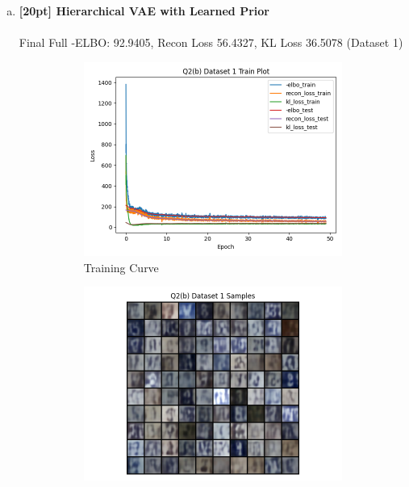 \documentclass{article}
\begin{document}
\begin{enumerate}[(a)]
        \newpage

        \item {\bf [20pt] Hierarchical VAE with Learned Prior} \\\\
        Final Full -ELBO: 92.9405, Recon Loss 56.4327, KL Loss 36.5078 (Dataset 1)
        \begin{figure}[H]
               \centering
               \begin{subfigure}[b]{0.475\textwidth}
                   \centering
                   \includegraphics[width=\textwidth]{figures/q2_b_dset1_train_plot.png}
                   \caption{Training Curve}
               \end{subfigure}
               \hfill
               \begin{subfigure}[b]{0.475\textwidth}
                   \centering
                   \includegraphics[width=\textwidth]{figures/q2_b_dset1_samples.png}

\end{subfigure}
\end{figure}
\end{enumerate}
\end{document}
